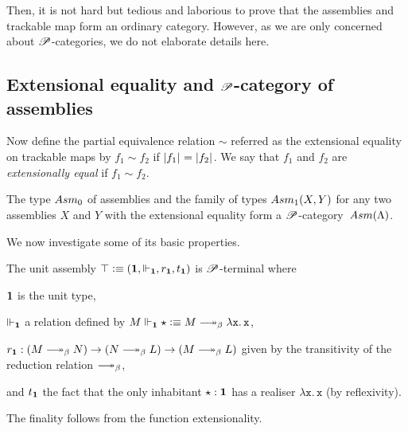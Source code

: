\documentclass[a4paper,UKenglish,numberwithinsect,cleveref,thm-restate]{lipics-v2021}
\numberwithin{equation}{section}
\theoremstyle{plain}
\begin{document}
Then, it is not hard but tedious and laborious to prove that the assemblies and trackable map form an ordinary category.
However, as we are only concerned about $\mathscr{P}$-categories, we do not elaborate details here.



\subsection{Extensional equality and \texorpdfstring{$\mathscr{P}$}{P}-category of assemblies}

Now define the partial equivalence relation $\sim$ referred as the extensional equality on trackable maps by $f_1 \sim f_2$ if $\mathopen{}\left|f_1\right|_{}^{}\mathclose{} = \mathopen{}\left|f_2\right|_{}^{}\mathclose{}$. We say that $f_1$ and $f_2$ are \emph{extensionally equal} if $f_1 \sim f_2$.
\begin{proposition}
  The type $\Asm_0$ of assemblies and the family of types $\Asm_1(X, Y)$ for any two assemblies $X$ and $Y$ with the extensional equality form a $\mathscr{P}$-category~$\Asm(\Lambda)$.
\end{proposition}

We now investigate some of its basic properties.

\begin{example}
  The unit assembly $\top \vcentcolon\equiv (\mathbf{1}, \Vdash_{\mathbf{1}}, r_{\mathbf{1}}, t_{\mathbf{1}})$ is $\mathscr{P}$-terminal where 
  \begin{romanenumerate}
    \item $\mathbf{1}$ is the unit type,  
    \item $\Vdash_{\mathbf{1}}$ a relation defined by $M \Vdash_{\Unit} \star \defeq M \reduce \mathtt{\lambda x.\, x}$, 
    \item $r_{\Unit}: (M \reduce N) \to (N \reduce L) \to (M \reduce L)$ given by the transitivity of the reduction relation $\reduce$,
    \item and $t_{\mathbf{1}}$ the fact that the only inhabitant $\star : \mathbf{1}$ has a realiser $\mathtt{\lambda x.\, x}$ (by reflexivity).
  \end{romanenumerate}
  The finality follows from the function extensionality.
\end{example}
\end{document}
